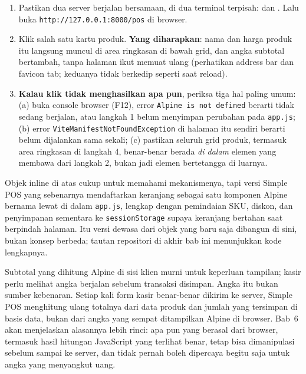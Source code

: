 \begin{enumerate}
     untuk menampilkan tiap item dan  untuk
    subtotal berjalan:
    \begin{lstlisting}[language=html, title=\lstfile{resources/views/pos/create.blade.php}]
<div class="mt-4 border-t pt-3">
    <template x-for="item in cart" :key="item.id">
        <p x-text="item.name + ' - Rp ' + item.price"></p>
    </template>
    <p class="font-semibold mt-2">Subtotal: Rp <span x-text="subtotal()"></span></p>
</div>
    \end{lstlisting}
  \item Pastikan dua server berjalan bersamaan, di dua terminal terpisah:
     dan . Lalu buka
    \texttt{http://127.0.0.1:8000/pos} di browser.
  \item Klik salah satu kartu produk. \textbf{Yang diharapkan}: nama dan
    harga produk itu langsung muncul di area ringkasan di bawah grid, dan
    angka subtotal bertambah, tanpa halaman ikut memuat ulang (perhatikan
    address bar dan favicon tab; keduanya tidak berkedip seperti saat
    reload).
  \item \textbf{Kalau klik tidak menghasilkan apa pun}, periksa tiga hal
    paling umum: (a) buka console browser (F12), error
    \texttt{Alpine is not defined} berarti  tidak sedang
    berjalan, atau langkah 1 belum menyimpan perubahan pada
    \texttt{app.js}; (b) error \texttt{ViteManifestNotFoundException} di
    halaman itu sendiri berarti  belum dijalankan sama
    sekali; (c) pastikan seluruh grid produk, termasuk area ringkasan di
    langkah 4, benar-benar berada \textit{di dalam} elemen yang membawa
     dari langkah 2, bukan jadi elemen bertetangga di luarnya.
\end{enumerate}

Objek  inline di atas cukup untuk memahami mekanismenya, tapi
versi Simple POS yang sebenarnya mendaftarkan keranjang sebagai satu
komponen Alpine bernama lewat  di dalam
\texttt{app.js}, lengkap dengan pemindaian SKU, diskon, dan penyimpanan
sementara ke \texttt{sessionStorage} supaya keranjang bertahan saat
berpindah halaman. Itu versi dewasa dari objek  yang baru saja
dibangun di sini, bukan konsep berbeda; tautan repositori di akhir bab ini
menunjukkan kode lengkapnya.

Subtotal yang dihitung Alpine di sisi klien murni untuk keperluan tampilan;
kasir perlu melihat angka berjalan sebelum transaksi disimpan. Angka itu
bukan sumber kebenaran. Setiap kali form kasir benar-benar dikirim ke
server, Simple POS menghitung ulang totalnya dari data produk dan jumlah
yang tersimpan di basis data, bukan dari angka yang sempat ditampilkan
Alpine di browser. Bab~6 akan menjelaskan alasannya lebih rinci: apa pun
yang berasal dari browser, termasuk hasil hitungan JavaScript yang terlihat
benar, tetap bisa dimanipulasi sebelum sampai ke server, dan tidak pernah
boleh dipercaya begitu saja untuk angka yang menyangkut uang.

